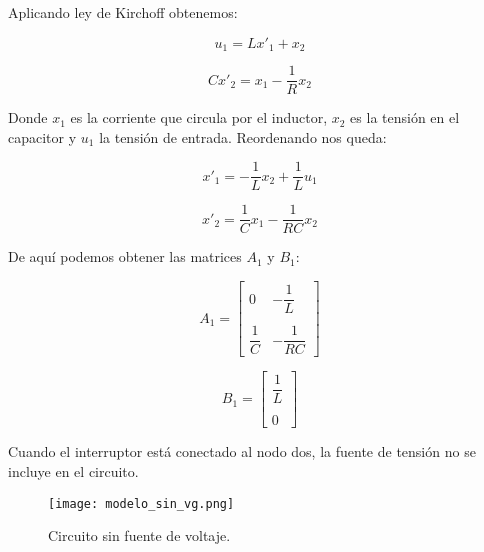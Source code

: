 Aplicando ley de Kirchoff obtenemos:

\vspace{-0.5cm}
\begin{equation}
    u_1 = Lx'_1 + x_2
\end{equation}

\vspace{-0.5cm}
\begin{equation}
    Cx'_2 = x_1 - \dfrac{1}{R} x_2 
\end{equation}

Donde $x_1$ es la corriente que circula por el inductor, $x_2$ es la tensión en el capacitor y $u_1$ la tensión de entrada.
Reordenando nos queda:

\vspace{-0.5cm}
\begin{equation}
    x'_1 = -\dfrac{1}{L} x_2 + \dfrac{1}{L} u_1
\end{equation}

\vspace{-0.5cm}
\begin{equation}
    x'_2 = \dfrac{1}{C}x_1 - \dfrac{1}{RC} x_2 
\end{equation}

De aquí podemos obtener las matrices $A_1$ y $B_1$:

\begin{equation}
    A_1 = \begin{bmatrix}
        0 & -\dfrac{1}{L}\\
        \\
        \dfrac{1}{C} & -\dfrac{1}{RC}
    \end{bmatrix}
\end{equation}

\vspace{-0.5cm}
\begin{equation}
    B_1 = \begin{bmatrix}
        \dfrac{1}{L}\\
        \\
        0
    \end{bmatrix}
\end{equation}

Cuando el interruptor está conectado al nodo dos, la fuente de tensión 
no se incluye en el circuito.

\begin{figure}[H]
    \centering
    \texttt{[image: modelo\_sin\_vg.png]}
    \vspace{-0.25cm}
    \caption{Circuito sin fuente de voltaje.}
    \label{fig:modelado_sin_vg}
\end{figure}
\vspace{-0.5cm}


